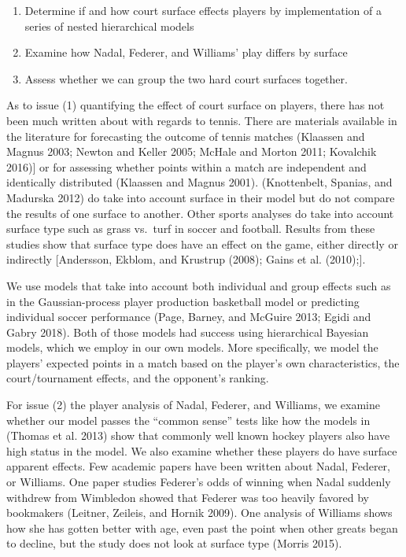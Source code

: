 \documentclass[]{article}
\begin{document}
\begin{enumerate}
\def\labelenumi{\arabic{enumi}.}
\item
  Determine if and how court surface effects players by implementation
  of a series of nested hierarchical models
\item
  Examine how Nadal, Federer, and Williams' play differs by surface
\item
  Assess whether we can group the two hard court surfaces together.
\end{enumerate}

As to issue (1) quantifying the effect of court surface on players,
there has not been much written about with regards to tennis. There are
materials available in the literature for forecasting the outcome of
tennis matches (Klaassen and Magnus 2003; Newton and Keller 2005; McHale
and Morton 2011; Kovalchik 2016){]} or for assessing whether points
within a match are independent and identically distributed (Klaassen and
Magnus 2001). (Knottenbelt, Spanias, and Madurska 2012) do take into
account surface in their model but do not compare the results of one
surface to another. Other sports analyses do take into account surface
type such as grass vs.~turf in soccer and football. Results from these
studies show that surface type does have an effect on the game, either
directly or indirectly {[}Andersson, Ekblom, and Krustrup (2008); Gains
et al. (2010);{]}.

We use models that take into account both individual and group effects
such as in the Gaussian-process player production basketball model or
predicting individual soccer performance (Page, Barney, and McGuire
2013; Egidi and Gabry 2018). Both of those models had success using
hierarchical Bayesian models, which we employ in our own models. More
specifically, we model the players' expected points in a match based on
the player's own characteristics, the court/tournament effects, and the
opponent's ranking.

For issue (2) the player analysis of Nadal, Federer, and Williams, we
examine whether our model passes the ``common sense'' tests like how the
models in (Thomas et al. 2013) show that commonly well known hockey
players also have high status in the model. We also examine whether
these players do have surface apparent effects. Few academic papers have
been written about Nadal, Federer, or Williams. One paper studies
Federer's odds of winning when Nadal suddenly withdrew from Wimbledon
showed that Federer was too heavily favored by bookmakers (Leitner,
Zeileis, and Hornik 2009). One analysis of Williams shows how she has
gotten better with age, even past the point when other greats began to
decline, but the study does not look at surface type (Morris 2015).
\end{document}
